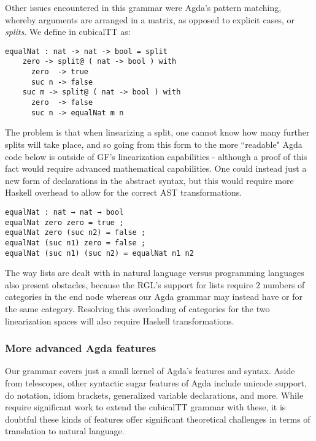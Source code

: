 Other issues encountered in this grammar were Agda's pattern matching, whereby
arguments are arranged in a matrix, as opposed to explicit cases, or \emph{splits}.
We define  in cubicalTT as:

\begin{verbatim}
equalNat : nat -> nat -> bool = split
    zero -> split@ ( nat -> bool ) with
      zero  -> true
      suc n -> false
    suc m -> split@ ( nat -> bool ) with
      zero  -> false
      suc n -> equalNat m n
\end{verbatim}

The problem is that when linearizing a split, one cannot know how many further
splits will take place, and so going from this form to the more ``readable" Agda
code below is outside of GF's linearization capabilities - although a proof of
this fact would require advanced mathematical capabilities. One could instead
just a new form of declarations in the abstract syntax, but this would require
more Haskell overhead to allow for the correct AST transformations.

\begin{verbatim}
equalNat : nat → nat → bool
equalNat zero zero = true ; 
equalNat zero (suc n2) = false ;
equalNat (suc n1) zero = false ;
equalNat (suc n1) (suc n2) = equalNat n1 n2
\end{verbatim}

The way lists are dealt with in natural language versus programming
languages also present obstacles, because the RGL's support for lists require $2$ 
numbers of categories in the end node whereas our Agda
grammar may instead have  or  for the same
category. Resolving this overloading of categories for the two linearization
spaces will also require Haskell transformations. 

\subsubsection{More advanced Agda features}

Our grammar covers just a small kernel of Agda's features and
syntax. Aside from telescopes, other syntactic sugar features
of Agda include unicode support, do notation, idiom brackets, generalized
variable declarations, and more. While require significant work to extend the 
cubicalTT grammar with these, it is doubtful
these kinds of features offer significant theoretical challenges in terms of
translation to natural language.

